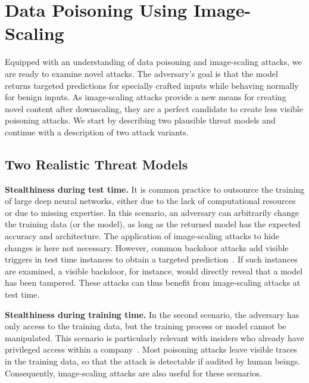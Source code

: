 \documentclass[conference]{IEEEtran}
\renewcommand{\paragraph}[1]{{\vskip 8pt \noindent\bf #1 }}
\begin{document}
\section{Data Poisoning Using Image-Scaling}
\label{sec:poisoning-scaling}
Equipped with an understanding of data poisoning and image-scaling 
attacks, we are ready to examine novel attacks.
The adversary's goal is that the model returns targeted predictions for 
specially crafted inputs while behaving normally for 
benign inputs. As image-scaling attacks provide a new means for 
creating novel content after downscaling, they are a perfect 
candidate to create less visible poisoning attacks.
We start by describing two plausible threat models and continue with a 
description of two attack variants.

\subsection{Two Realistic Threat Models}

\paragraph{Stealthiness during test time.}
It is common practice to outsource the training of large deep 
neural networks, either due to the lack of computational resources or 
due to missing expertise. 
In this scenario, an adversary can arbitrarily change the training data 
(or the model), as long as the returned model has the expected accuracy 
and architecture. The application of image-scaling attacks to hide 
changes is here not necessary. However, common backdoor attacks add 
visible triggers in test time instances to obtain a targeted 
prediction~\citep[e.g.][]{GuDolGar17,LiuMaAaf+18}. If such instances 
are examined, a visible backdoor, for instance, would directly reveal 
that a model has been tampered. These attacks can thus benefit from 
image-scaling attacks at test time.

\paragraph{Stealthiness during training time.} 
In the second scenario, the adversary has only access to the training 
data, but the training process or model cannot be manipulated. This 
scenario is particularly relevant with insiders who already have 
privileged access within a company~\citep{Sto15}.
Most poisoning attacks leave visible traces in the training data, so 
that the attack is detectable if audited by human beings. 
Consequently, image-scaling attacks are also useful for these scenarios.
\end{document}
